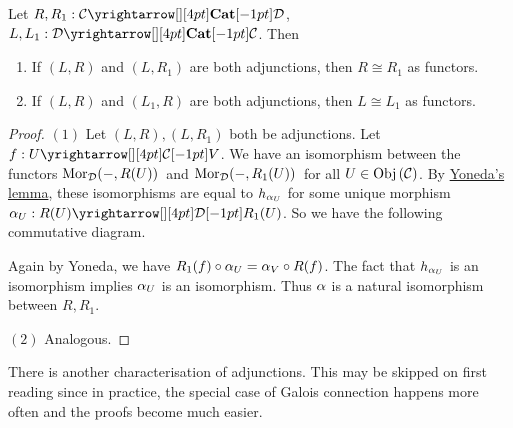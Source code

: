 \begin{prop}

  Let $R, R_1 : \map{\CC}{\DD}{\CAT}{}$, $L, L_1: \map{\DD}{\CC}{\CAT}{}$.
  Then \begin{enumerate}
    \item If $(L,R)$ and $(L,R_1)$ are both adjunctions, 
    then $R \cong R_1$ as functors. 
    \item If $(L,R)$ and $(L_1, R)$ are both adjunctions, 
    then $L \cong L_1$ as functors. 
  \end{enumerate}
\end{prop}
\begin{proof}
  $(1)$ Let $(L,R), (L,R_1)$ both be adjunctions. 
  Let $f : \map{U}{V}{\CC}{}$. 
  We have an isomorphism between the functors 
  $\mathrm{Mor}_{\mathcal{D}}(-, R(U))\,$ and $\mathrm{Mor}_{\mathcal{D}}(-, R_1(U))\,$
  for all $U \in \mathrm{Obj}\left(\mathcal{C}\right)$. 
  By \hyperlink{yoneda}{Yoneda's lemma}, 
  these isomorphisms are equal to $h_{\alpha_U}$ 
  for some unique morphism $\al_U : \map{R(U)}{R_1(U)}{\DD}{}$.
  So we have the following commutative diagram. 
  \begin{figure}[H]
    \centering
  \end{figure}
  Again by Yoneda, 
  we have $R_1(f) \circ \alpha_U = \alpha_V \circ R(f)$.
  The fact that $h_{\alpha_U}$ is an isomorphism implies 
  $\alpha_U$ is an isomorphism. 
  Thus $\alpha$ is a natural isomorphism between $R, R_1$.

  $(2)$ Analogous. 
\end{proof}

\begin{rmk}
  There is another characterisation of adjunctions.
  This may be skipped on first reading since 
  in practice, the special case of Galois connection happens more often and 
  the proofs become much easier. 
\end{rmk}

